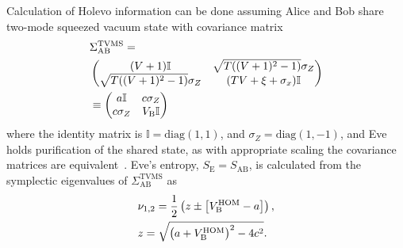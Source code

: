 \documentclass[%
reprint,
superscriptaddress,
 amsmath,amssymb,amsfonts,
 aps,
 pra,
 longbibliography
]{revtex4-2}
\newcommand{\ind}[1]{\mathrm{#1}}
\begin{document}
Calculation of Holevo information can be done assuming Alice and Bob share two-mode squeezed vacuum state with covariance matrix
\begin{align}
  \label{eq:TVMS}
    &\Sigma_{\ind{AB}}^{\ind{TVMS}}=\notag\\&\begin{pmatrix}
        (V+1)\mathbb{I}&\sqrt{T((V+1)^2-1)}\sigma_Z\\
        \sqrt{T((V+1)^2-1)}\sigma_Z&(TV+\xi+\sigma_x)\mathbb{I}
    \end{pmatrix}\notag\\
    &\equiv\begin{pmatrix}
        a\mathbb{I}&c\sigma_Z\\
        c\sigma_Z&V_{\ind{B}}\mathbb{I}
    \end{pmatrix}
\end{align}
where the identity matrix is $\mathbb{I}=\ind{diag}(1,1)$, 
and $\sigma_Z=\ind{diag}(1,-1)$, and Eve holds purification of the shared state, as with appropriate scaling the covariance matrices are equivalent~\cite{laudenbach2018continuous}.
Eve's entropy, $S_{\ind{E}}=S_{\ind{AB}}$, is calculated from the 
symplectic eigenvalues of $\Sigma_{\ind{AB}}^{\ind{TVMS}}$ as~\cite{Weed:rmp:2012}
\begin{align}
\label{eq:nu12}
    &\nu_{1,2} =\frac{1}{2}\left(z\pm\left[V_{\ind{B}}^{\ind{HOM}}-a\right]\right),\notag\\ &z=\sqrt{\left(a+V_{\ind{B}}^{\ind{HOM}}\right)^2-4c^2}.
\end{align}
\end{document}
